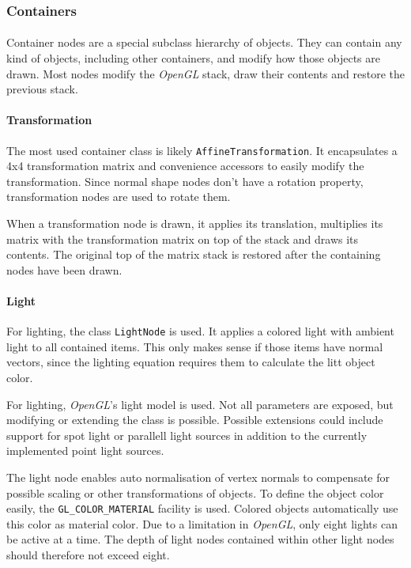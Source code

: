 \subsubsection{Containers\label{ImplContainer}}
\paragraph{}
Container nodes are a special subclass hierarchy of objects.
They can contain any kind of objects, including other containers, and modify how those objects are drawn.
Most nodes modify the \textit{OpenGL} stack, draw their contents and restore the previous stack.

\paragraph{Transformation}
The most used container class is likely \lstinline{AffineTransformation}\cite{affine}.
It encapsulates a 4x4 transformation matrix and convenience accessors to easily modify the transformation.
Since normal shape nodes don't have a rotation property, transformation nodes are used to rotate them.

When a transformation node is drawn, it applies its translation, multiplies its matrix with the transformation matrix on top of the stack and draws its contents.
The original top of the matrix stack is restored after the containing nodes have been drawn.

\paragraph{Light}
For lighting, the class \lstinline{LightNode} is used.
It applies a colored light with ambient light to all contained items.
This only makes sense if those items have normal vectors, since the lighting equation requires them to calculate the litt object color.

For lighting, \textit{OpenGL}'s light model is used.
Not all parameters are exposed, but modifying or extending the class is possible.
Possible extensions could include support for spot light or parallell light sources in addition to the currently implemented point light sources.

The light node enables auto normalisation of vertex normals to compensate for possible scaling or other transformations of objects.
To define the object color easily, the \lstinline{GL_COLOR_MATERIAL} facility is used.
Colored objects automatically use this color as material color.
Due to a limitation in \textit{OpenGL}, only eight lights can be active at a time.
The depth of light nodes contained within other light nodes should therefore not exceed eight.

